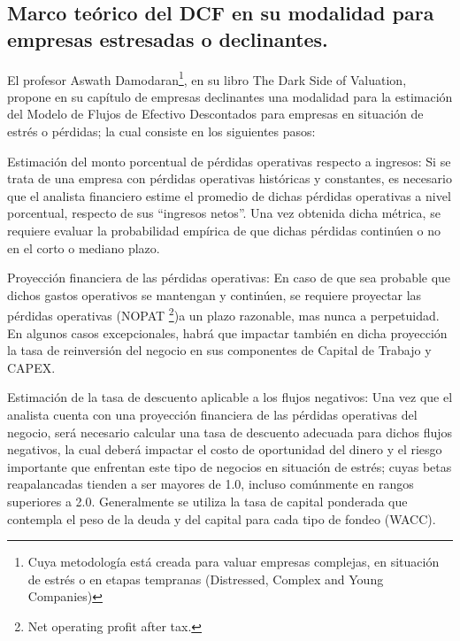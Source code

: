 \subsection{Marco te\'orico del DCF en su modalidad para empresas estresadas o declinantes.}

El profesor Aswath Damodaran\footnote{Cuya metodolog\'ia est\'a creada para valuar empresas complejas, en situaci\'on de estr\'es o en etapas tempranas (Distressed, Complex and Young Companies)}, en su libro The Dark Side of Valuation, propone en su cap\'itulo de empresas declinantes una modalidad para la estimaci\'on del Modelo de Flujos de Efectivo Descontados para empresas en situación de estr\'es o p\'erdidas; la cual consiste en los siguientes pasos:

\begin{enumerte}[I.]

\item Estimaci\'on del monto porcentual de p\'erdidas operativas respecto a ingresos: Si se trata de una empresa con p\'erdidas operativas hist\'oricas y constantes, es necesario que el analista financiero estime el promedio de dichas p\'erdidas operativas a nivel porcentual, respecto de sus ``ingresos netos''. Una vez obtenida dicha m\'etrica, se requiere evaluar la probabilidad emp\'irica de que dichas p\'erdidas contin\'uen o no en el corto o mediano plazo.

\item Proyecci\'on financiera de las p\'erdidas operativas: En caso de que sea probable que dichos gastos operativos se mantengan y contin\'uen, se requiere proyectar las p\'erdidas operativas (NOPAT \footnote{ Net operating profit after tax.})a un plazo razonable, mas nunca a perpetuidad. En algunos casos excepcionales, habr\'a que impactar tambi\'en en dicha proyecci\'on la tasa de reinversi\'on del negocio en sus componentes de Capital de Trabajo y CAPEX.

\item Estimaci\'on de la tasa de descuento aplicable a los flujos negativos: Una vez que el analista cuenta con una proyecci\'on financiera de las p\'erdidas operativas del negocio, ser\'a necesario calcular una tasa de descuento adecuada para dichos flujos negativos, la cual deber\'a impactar el costo de oportunidad del dinero y el riesgo importante que enfrentan este tipo de negocios en situación de estrés; cuyas betas reapalancadas tienden a ser mayores de 1.0, incluso com\'unmente en rangos superiores a 2.0. Generalmente se utiliza la tasa de capital ponderada que contempla el peso de la deuda y del capital para cada tipo de fondeo (WACC).


\end{enumerte}
